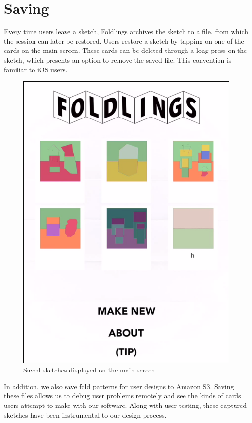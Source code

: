 \section{Saving}\label{saving}

Every time users leave a sketch, Foldlings archives the sketch to a
file, from which the session can later be restored. Users restore a
sketch by tapping on one of the cards on the main screen. These cards
can be deleted through a long press on the sketch, which presents an
option to remove the saved file. This convention is familiar to iOS
users.

\begin{figure}[htbp]
\centering
\includegraphics{figures/34_UI_Saving/saved_sketches.png}
\caption{Saved sketches displayed on the main screen.}
\end{figure}

In addition, we also save fold patterns for user designs to Amazon S3.
Saving these files allows us to debug user problems remotely and see the
kinds of cards users attempt to make with our software. Along with user
testing, these captured sketches have been instrumental to our design
process.
